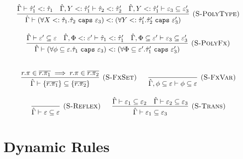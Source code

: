 \documentclass{llncs}
\newcommand{\keywadj}[1]{\mathtt{#1}}
\newcommand{\keyw}[1]{\keywadj{#1}~}
\newcommand{\kw}[1]{\keyw{ #1 }}
\begin{document}
\[\begin{array}{c}
\infer[\textsc{(S-PolyType)}]
	{\hat \Gamma \vdash (\forall X <: \hat \tau_1 . \hat \tau_2~\kw{caps} \varepsilon_3) <: (\forall Y <: \hat \tau_1' . \hat \tau_2'~\kw{caps} \varepsilon_3')}
	{\hat \Gamma \vdash \hat \tau_1' <: \hat \tau_1 & \hat \Gamma, Y <: \hat \tau_1' \vdash \hat \tau_2 <: \hat \tau_2' & \hat \Gamma, Y <: \hat \tau_1' \vdash \varepsilon_3 \subseteq \varepsilon_3'}\\[3ex]

\infer[\textsc{(S-PolyFx)}]
	{\hat \Gamma \vdash (\forall \phi \subseteq \varepsilon. \hat \tau_1~\kw{caps} \varepsilon_3) <: (\forall \Phi \subseteq \varepsilon'. \hat \tau_1'~\kw{caps} \varepsilon_3')}
	{\hat \Gamma \vdash \varepsilon' \subseteq \varepsilon & \hat \Gamma, \Phi <: \varepsilon' \vdash \hat \tau_1 <: \hat \tau_1' & \hat \Gamma, \Phi \subseteq \varepsilon' \vdash \varepsilon_3 \subseteq \varepsilon_3'} \\[3ex]

\end{array}
\]






\fbox{$\hat \Gamma \vdash \varepsilon \subseteq \varepsilon$}

\[
\begin{array}{c}


\infer[\textsc{(S-FxSet)}]
	{\hat \Gamma \vdash \{ \overline{r.\pi_1} \} \subseteq \{ \overline{r.\pi_2} \} }
	{r.\pi \in \overline{r.\pi_1} \implies r.\pi \in \overline{r.\pi_2}}

~~~~~

\infer[\textsc{(S-FxVar)}]
	{\hat \Gamma, \phi \subseteq \varepsilon \vdash \phi \subseteq \varepsilon}
	{}\\[3ex]

\infer[\textsc{(S-Reflex)}]
	{\hat \Gamma \vdash \varepsilon \subseteq \varepsilon}
	{}
~~~~~
\infer[\textsc{(S-Trans)}]
	{\hat \Gamma \vdash \varepsilon_1 \subseteq \varepsilon_3}
	{\hat \Gamma \vdash \varepsilon_1 \subseteq \varepsilon_2 & \hat \Gamma \vdash \varepsilon_2 \subseteq \varepsilon_3}

\end{array}
\]









\section{Dynamic Rules}
\end{document}
